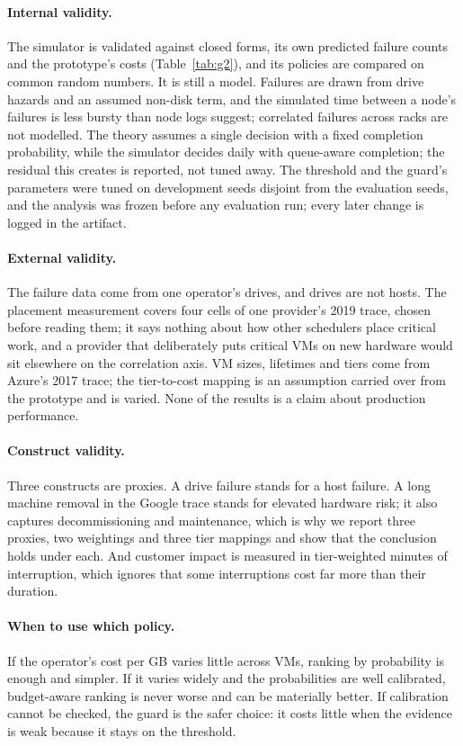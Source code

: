 \paragraph{Internal validity.}
The simulator is validated against closed forms, its own predicted failure counts and the
prototype's costs (Table~\ref{tab:g2}), and its policies are compared on common random numbers.
It is still a model. Failures are drawn from drive hazards and an assumed non-disk term, and the
simulated time between a node's failures is less bursty than node logs suggest; correlated
failures across racks are not modelled. The theory assumes a single decision with a fixed
completion probability, while the simulator decides daily with queue-aware completion; the
residual this creates is reported, not tuned away. The threshold and the guard's parameters were
tuned on development seeds disjoint from the evaluation seeds, and the analysis was frozen before
any evaluation run; every later change is logged in the artifact.

\paragraph{External validity.}
The failure data come from one operator's drives, and drives are not hosts. The placement
measurement covers four cells of one provider's 2019 trace, chosen before reading them; it says
nothing about how other schedulers place critical work, and a provider that deliberately puts
critical VMs on new hardware would sit elsewhere on the correlation axis. VM sizes, lifetimes and
tiers come from Azure's 2017 trace; the tier-to-cost mapping is an assumption carried over from
the prototype and is varied. None of the results is a claim about production performance.

\paragraph{Construct validity.}
Three constructs are proxies. A drive failure stands for a host failure. A long machine removal in
the Google trace stands for elevated hardware risk; it also captures decommissioning and
maintenance, which is why we report three proxies, two weightings and three tier mappings and show that the
conclusion holds under each.
And customer impact is measured in tier-weighted minutes of interruption, which ignores that some
interruptions cost far more than their duration.

\paragraph{When to use which policy.}
If the operator's cost per GB varies little across VMs, ranking by probability is enough and
simpler. If it varies widely and the probabilities are well calibrated, budget-aware ranking is
never worse and can be materially better. If calibration cannot be checked, the guard is the safer
choice: it costs little when the evidence is weak because it stays on the threshold.

